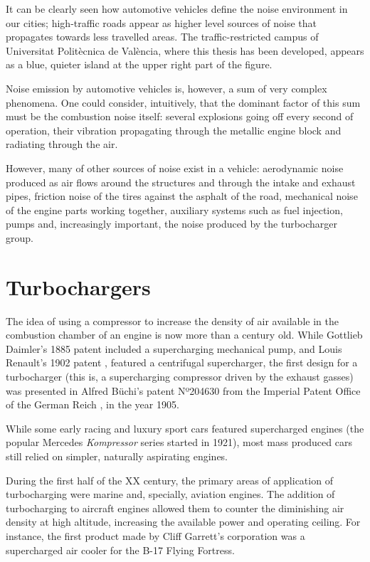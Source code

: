 It can be clearly seen how automotive vehicles define the noise environment in our cities; high-traffic roads appear as higher level sources of noise that propagates towards less travelled areas. The traffic-restricted campus of Universitat Politècnica de València, where this thesis has been developed, appears as a blue, quieter island at the upper right part of the figure.

Noise emission by automotive vehicles is, however, a sum of very complex phenomena. One could consider, intuitively, that the dominant factor of this sum must be the combustion noise itself: several explosions going off every second of operation, their vibration propagating through the metallic engine block and radiating through the air.

However, many of other sources of noise exist in a vehicle: aerodynamic noise produced as air flows around the structures and through the intake and exhaust pipes, friction noise of the tires against the asphalt of the road, mechanical noise of the engine parts working together, auxiliary systems such as fuel injection, pumps and, increasingly important, the noise produced by the turbocharger group.

\section{Turbochargers}

The idea of using a compressor to increase the density of air available in the combustion chamber of an engine is now more than a century old. While Gottlieb Daimler's 1885 patent \cite{daimler1885patent} included a supercharging mechanical pump, and Louis Renault's 1902 patent \cite{renault1902patent}, featured a centrifugal supercharger, the first design for a turbocharger (this is, a supercharging compressor driven by the exhaust gasses) was presented in Alfred Büchi's patent Nº204630 from the Imperial Patent Office of the German Reich \cite{buchi1905patent}, in the year 1905.

While some early racing and luxury sport cars featured supercharged engines (the popular Mercedes \emph{Kompressor} series started in 1921), most mass produced cars still relied on simpler, naturally aspirating engines.

During the first half of the XX century, the primary areas of application of turbocharging were marine and, specially, aviation engines. The addition of turbocharging to aircraft engines allowed them to counter the diminishing air density at high altitude, increasing the available power and operating ceiling. For instance, the first product made by Cliff Garrett's corporation was a supercharged air cooler for the B-17 Flying Fortress.


